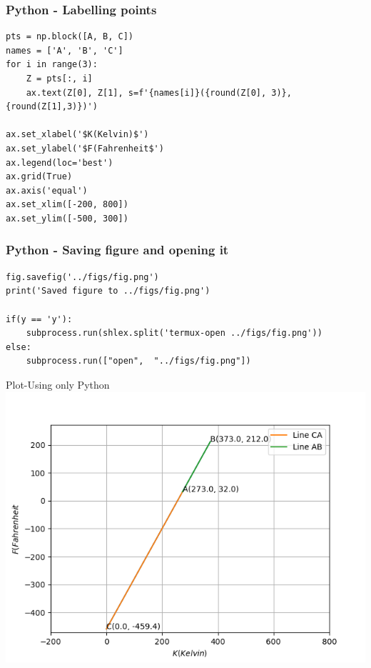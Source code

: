 \documentclass{beamer}
\begin{document}
\begin{frame}[fragile]
    \frametitle{Python - Labelling points}
    \begin{lstlisting}
pts = np.block([A, B, C])
names = ['A', 'B', 'C']
for i in range(3):
    Z = pts[:, i]
    ax.text(Z[0], Z[1], s=f'{names[i]}({round(Z[0], 3)}, {round(Z[1],3)})')

ax.set_xlabel('$K(Kelvin)$')
ax.set_ylabel('$F(Fahrenheit$')
ax.legend(loc='best')
ax.grid(True) 
ax.axis('equal')
ax.set_xlim([-200, 800])
ax.set_ylim([-500, 300])
    \end{lstlisting}
\end{frame}

\begin{frame}[fragile]
    \frametitle{Python - Saving figure and opening it}
    \begin{lstlisting}
fig.savefig('../figs/fig.png')
print('Saved figure to ../figs/fig.png')

if(y == 'y'):
    subprocess.run(shlex.split('termux-open ../figs/fig.png'))
else:
    subprocess.run(["open",  "../figs/fig.png"])
    \end{lstlisting}
\end{frame}


\begin{frame}{Plot-Using only Python}
    \centering
    \includegraphics[width=\columnwidth, height=0.8\textheight, keepaspectratio]{../figs/fig.png}     
\end{frame}
\end{document}
